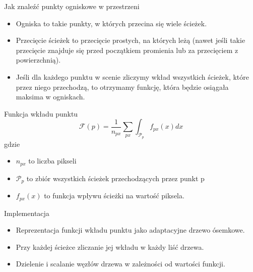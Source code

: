 \documentclass{beamer}
\begin{document}
\begin{frame}{Jak znaleźć punkty ogniskowe w przestrzeni}
    \begin{itemize}
        \item Ogniska to takie punkty, w których przecina się wiele ścieżek.
        \item Przecięcie ścieżek to przecięcie prostych, na których leżą (nawet jeśli takie przecięcie znajduje się przed początkiem promienia lub za przecięciem z powierzchnią).
        \item Jeśli dla każdego punktu w scenie zliczymy wkład wszystkich ścieżek, które przez niego przechodzą, to otrzymamy funkcję, która będzie osiągała maksima w ogniskach.
    \end{itemize}
\end{frame}

\begin{frame}{Funkcja wkładu punktu}
    $$\mathcal{F}(p) = \frac{1}{n_{px}}\sum_{px}\int_{\mathcal{P}_p}f_{px}(x)dx$$
    gdzie \begin{itemize}
        \item $n_{px}$ to liczba pikseli
        \item $\mathcal{P}_p$ to zbiór wszystkich ścieżek przechodzących przez punkt p
        \item $f_{px}(x)$ to funkcja wpływu ścieżki na wartość piksela.
    \end{itemize}
\end{frame}

\begin{frame}{Implementacja}
\begin{itemize}
    \item Reprezentacja funkcji wkładu punktu jako adaptacyjne drzewo ósemkowe.
    \item Przy każdej ścieżce zliczanie jej wkładu w każdy liść drzewa.
    \item Dzielenie i scalanie węzłów drzewa w zależności od wartości funkcji.
\end{itemize}
\end{frame}
\end{document}
